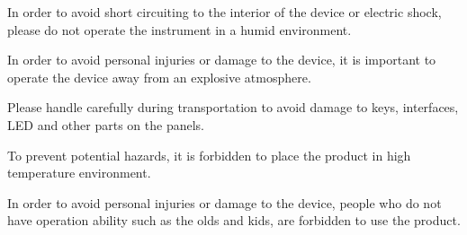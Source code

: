 \vspace{0.7cm}

\vspace{0.2cm}
\hspace{-0.2cm}In order to avoid short circuiting to the interior of the device or electric shock, please do not operate the instrument in a humid environment.


\vspace{0.7cm}

\vspace{0.2cm}
\hspace{-0.2cm}In order to avoid personal injuries or damage to the device, it is important to operate the device away from an explosive atmosphere.

\vspace{0.7cm}

\vspace{0.2cm}
\hspace{-0.2cm}Please handle carefully during transportation to avoid damage to keys, interfaces, LED and other parts on the panels.

\vspace{0.7cm}

\vspace{0.2cm}
\hspace{-0.2cm}To prevent potential hazards, it is forbidden to place the product in high temperature environment.

\vspace{0.7cm}

\vspace{0.2cm}
\hspace{-0.2cm}In order to avoid personal injuries or damage to the device, people who do not have operation ability such as the olds and kids, are forbidden to use the product.

